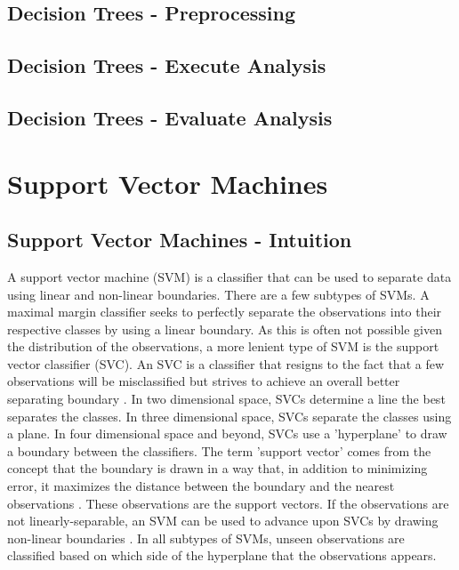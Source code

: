 \documentclass[sigconf]{acmart}
\begin{document}
\subsection{Decision Trees - Preprocessing}

\subsection{Decision Trees - Execute Analysis}

\subsection{Decision Trees - Evaluate Analysis}


\section{Support Vector Machines}

\subsection{Support Vector Machines - Intuition}

A support vector machine (SVM) is a classifier that can be used to separate data using linear and non-linear boundaries. There are a few subtypes of SVMs. A maximal margin classifier seeks to perfectly separate the observations into their respective classes by using a linear boundary. As this is often not possible given the distribution of the observations, a more lenient type of SVM is the support vector classifier (SVC). An SVC is a classifier that resigns to the fact that a few observations will be misclassified but strives to achieve an overall better separating boundary \cite{cite03}.
In two dimensional space, SVCs determine a line the best separates the classes. In three dimensional space, SVCs separate the classes using a plane. In four dimensional space and beyond, SVCs use a 'hyperplane' to draw a boundary between the classifiers. The term 'support vector' comes from the concept that the boundary is drawn in a way that, in addition to minimizing error, it maximizes the distance between the boundary and the nearest observations \cite{cite03}. These observations are the support vectors.
If the observations are not linearly-separable, an SVM can be used to advance upon SVCs by drawing non-linear boundaries \cite{cite03}. In all subtypes of SVMs, unseen observations are classified based on which side of the hyperplane that the observations appears.
\end{document}
